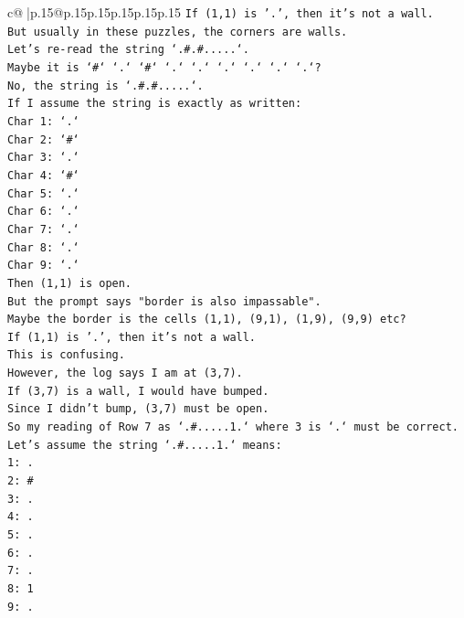 \documentclass{article}
\begin{document}
{\begin{supertabular}{c@{$\;$}|p{.15\linewidth}@{}p{.15\linewidth}p{.15\linewidth}p{.15\linewidth}p{.15\linewidth}p{.15\linewidth}}
{{{\texttt{If (1,1) is '.', then it's not a wall.} \\
\texttt{But usually in these puzzles, the corners are walls.} \\
\texttt{Let's re{-}read the string `.\#.\#.....`.} \\
\texttt{Maybe it is `\#` `.` `\#` `.` `.` `.` `.` `.` `.`?} \\
\texttt{No, the string is `.\#.\#.....`.} \\
\texttt{If I assume the string is exactly as written:} \\
\texttt{Char 1: `.`} \\
\texttt{Char 2: `\#`} \\
\texttt{Char 3: `.`} \\
\texttt{Char 4: `\#`} \\
\texttt{Char 5: `.`} \\
\texttt{Char 6: `.`} \\
\texttt{Char 7: `.`} \\
\texttt{Char 8: `.`} \\
\texttt{Char 9: `.`} \\
\texttt{Then (1,1) is open.} \\
\texttt{But the prompt says "border is also impassable".} \\
\texttt{Maybe the border is the cells (1,1), (9,1), (1,9), (9,9) etc?} \\
\texttt{If (1,1) is '.', then it's not a wall.} \\
\texttt{This is confusing.} \\
\texttt{However, the log says I am at (3,7).} \\
\texttt{If (3,7) is a wall, I would have bumped.} \\
\texttt{Since I didn't bump, (3,7) must be open.} \\
\texttt{So my reading of Row 7 as `.\#.....1.` where 3 is `.` must be correct.} \\
\texttt{Let's assume the string `.\#.....1.` means:} \\
\texttt{1: .} \\
\texttt{2: \#} \\
\texttt{3: .} \\
\texttt{4: .} \\
\texttt{5: .} \\
\texttt{6: .} \\
\texttt{7: .} \\
\texttt{8: 1} \\
\texttt{9: .} \\
}}}
\end{supertabular}}
\end{document}
